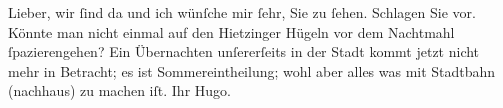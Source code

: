 \pstart
           \noindent{}{\pb}Lieber, wir{ }ſind da und ich wünſche mir{ }ſehr, Sie zu{ }ſehen. Schlagen
               Sie vor. Könnte man nicht einmal auf den Hietzinger Hügeln vor dem Nachtmahl{ }ſpazierengehen? Ein Übernachten
               unſererſeits in der Stadt kommt jetzt nicht mehr in Betracht; es ist
               Sommereintheilung; wohl aber alles was mit Stadtbahn (nachhaus) zu machen iſt.\pend
           \pstart Ihr \spacefill\mbox{Hugo.}\pend{}\endnumbering{}  \newcommand{\dateiname}{L01521}\newcommand{\titel}{Hugo von Hofmannsthal an Arthur Schnitzler, 29. 5. 1905}\newcommand{\editorInnen}{Martin Anton Müller und Gerd-Hermann Susen}
